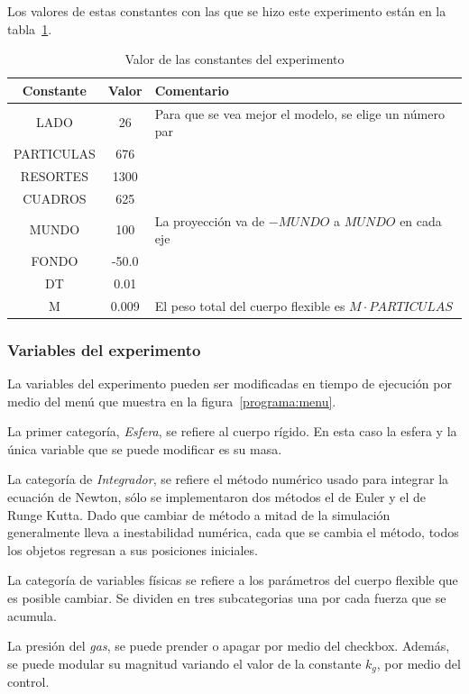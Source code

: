 Los valores de estas constantes con las que se hizo este experimento están en la tabla~\ref{valores:constantes}.
\begin{table}
\caption[Tabla con los valores de las constantes durante el experimento]{Valor de las constantes del experimento}
\label{valores:constantes}
\begin{center}
\begin{tabular} {|c|c|p{10cm}|} \hline
Constante & Valor & Comentario\\ \hline
 LADO & 26 & Para que se vea mejor el modelo, se elige un número par\\
 PARTICULAS & 676 &  \\
 RESORTES & 1300 & \\
 CUADROS & 625 & \\ \hline
 MUNDO & 100 & La proyección va de $-MUNDO$ a $MUNDO$ en cada eje\\
 FONDO & -50.0 & \\ \hline
 DT & 0.01 & \\ \hline
 M & 0.009 & El peso total del cuerpo flexible es $M \cdot PARTICULAS$ \\
\hline
\end{tabular}
\end{center}
\end{table}

\subsubsection{Variables del experimento}
La variables del experimento pueden ser modificadas en tiempo de ejecución por medio del menú que muestra en la figura~\ref{programa:menu}.

La primer categoría, \emph{Esfera}, se refiere al cuerpo rígido. En esta caso la esfera y la única variable que se puede modificar es su masa.

La categoría de \emph{Integrador}, se refiere el método numérico usado para integrar la ecuación de Newton, sólo se implementaron dos métodos el de Euler y el de Runge Kutta. Dado que cambiar de método a mitad de la simulación generalmente lleva a inestabilidad numérica, cada que se cambia el método, todos los objetos regresan a sus posiciones iniciales.

La categoría de variables físicas se refiere a los parámetros del cuerpo flexible que es posible cambiar. Se dividen en tres subcategorias una por cada fuerza que se acumula.

La presión del \emph{gas}, se puede prender o apagar por medio del checkbox. Además, se puede modular su magnitud variando el valor de la constante $k_{g}$, por medio del control.

